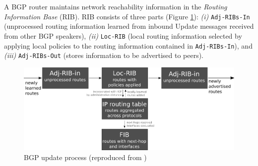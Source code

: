 A BGP router maintains network reachability information in the \textit{Routing Information Base} (RIB). RIB consists of three parts (Figure \ref{fig:bgp-update}): \textit{(i)} \texttt{Adj-RIBs-In} (unprocessed routing information learned from inbound Update messages received from other BGP speakers), \textit{(ii)} \texttt{Loc-RIB} (local routing information selected by applying local policies to the routing information contained in \texttt{Adj-RIBs-In}), and \textit{(iii)} \texttt{Adj-RIBs-Out} (stores information to be advertised to peers).

\begin{figure}[ht!]
	\centering
	\includegraphics[scale=0.5]{img/bgp-update.png}
	\caption{BGP update process (reproduced from \cite{thousandeyes})}
	\label{fig:bgp-update}
\end{figure}

